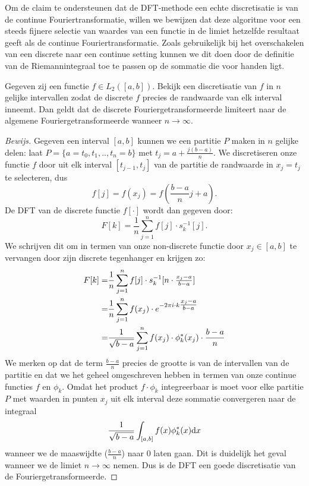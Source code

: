 Om de claim te ondersteunen dat de DFT-methode een echte discretisatie is van de continue Fouriertransformatie,
willen we bewijzen dat deze algoritme voor een steeds fijnere selectie van waardes van een functie in de 
limiet hetzelfde resultaat geeft als de continue Fouriertransformatie. 
Zoals gebruikelijk bij het overschakelen van een discrete naar een continue setting kunnen we dit doen 
door de definitie van de Riemannintegraal toe te passen op de sommatie die voor handen ligt.

\begin{stelling}
  Gegeven zij een functie $f\in L_2([a,b])$. Bekijk een discretisatie van $f$ in $n$ gelijke intervallen zodat de discrete $f$ precies 
  de randwaarde van elk interval inneemt.
  Dan geldt dat de discrete Fouriergetransformeerde limiteert naar de algemene Fouriergetransformeerde wanneer $n\to\infty$.
\end{stelling} 
\begin{proof}[Bewijs]
Gegeven een interval $[a,b]$ kunnen we een partitie $P$ maken in $n$ gelijke delen: laat $P=\{a=t_0,t_1,..,t_n=b\}$ met $t_j = a+\tfrac{j(b-a)}{n}$.
We discretiseren onze functie $f$ door uit elk interval $[t_{j-1},t_{j}]$ van de partitie de randwaarde in 
$x_j = t_j$ te selecteren, dus
\[
f[j] = f(x_j) = f(\frac{b-a}{n}j + a).
\]
De DFT van de discrete functie $f[\cdot]$ wordt dan gegeven door:
\[
F[k] = \frac1n\sum_{j=1}^n f[j] \cdot s_k^{-1}[j].
\]
We schrijven dit om in termen van onze non-discrete functie door $x_j\in[a,b]$ 
te vervangen door zijn discrete tegenhanger en krijgen zo:
\begin{eqnarray*}
  F[k] =& \frac{1}{n} \sum_{j=1}^n f[j]\cdot s_k^{-1}[n\cdot\tfrac{x_j-a}{b-a}] \\
       =& \frac{1}{n} \sum_{j=1}^n f(x_j)\cdot e^{-{2\pi i} \cdot k \tfrac{x_j-a}{b-a}}\\
       =&  \frac{1}{\sqrt{b-a}}\sum_{j=1}^n f(x_j)\cdot \phi^*_k(x_j) \cdot\frac{b-a}{n} 
\end{eqnarray*}
We merken op dat de term $\frac{b-a}{n}$ precies de grootte is van de intervallen van de partitie 
en dat we het geheel omgeschreven hebben in termen van onze continue functies $f$ en $\phi_k$.
Omdat het product $f\cdot\phi_k$ integreerbaar is moet voor elke partitie $P$ met 
waarden in punten $x_j$ uit elk interval deze sommatie convergeren naar de integraal
\[
  \frac{1}{\sqrt{b-a}} \int_{[a,b]} f(x) \phi^*_k(x) {\mathrm{d} x}
\]
wanneer we de maaswijdte ($\tfrac{b-a}{n}$) naar $0$ laten gaan. \cite{shilov}
Dit is duidelijk het geval wanneer we de limiet $n\to\infty$ nemen. 
Dus is de DFT een goede discretisatie van de Fouriergetransformeerde. 
\end{proof}

